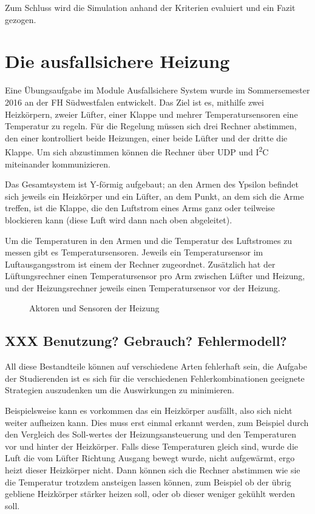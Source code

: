 Zum Schluss wird die Simulation anhand der Kriterien evaluiert und ein Fazit gezogen.

\clearpage
\section{Die ausfallsichere Heizung}\label{heizung}
Eine {\"{U}}bungsaufgabe im Module Ausfallsichere System wurde im Sommersemester 2016 an der FH S{\"{u}}dwestfalen entwickelt. Das Ziel ist es, mithilfe zwei Heizk{\"{o}}rpern, zweier
L{\"{u}}fter, einer Klappe und mehrer Temperatursensoren eine Temperatur zu regeln. F{\"{u}}r die Regelung m{\"{u}}ssen sich drei Rechner abstimmen, den einer kontrolliert
beide Heizungen, einer beide L{\"{u}}fter und der dritte die Klappe. Um sich abzustimmen k{\"{o}}nnen die Rechner {\"{u}}ber UDP und I\textsuperscript{2}C miteinander kommunizieren.

Das Gesamtsystem ist Y-f{\"{o}}rmig aufgebaut; an den Armen des Ypsilon befindet sich jeweils ein Heizk{\"{o}}rper und ein L{\"{u}}fter, an dem Punkt, an dem sich
die Arme treffen, ist die Klappe, die den Luftstrom eines Arms ganz oder teilweise blockieren kann (diese Luft wird dann nach oben abgeleitet).

Um die Temperaturen in den Armen und die Temperatur des Luftstromes zu messen gibt es Temperatursensoren. Jeweils ein Temperatursensor im Luftausgangsstrom ist einem
der Rechner zugeordnet. Zus{\"{a}}tzlich hat der L{\"{u}}ftungsrechner einen Temperatursensor pro Arm zwischen L{\"{u}}fter und Heizung, und der Heizungsrechner jeweils
einen Temperatursensor vor der Heizung.

\begin{figure}
	\centering
	\caption{Aktoren und Sensoren der Heizung}
	\label{fig:heizunghw}
\end{figure}

\subsection{XXX Benutzung? Gebrauch? Fehlermodell?}
All diese Bestandteile k{\"{o}}nnen auf verschiedene Arten fehlerhaft sein, die Aufgabe der Studierenden ist es sich f{\"{u}}r die verschiedenen Fehlerkombinationen
geeignete Strategien auszudenken um die Auswirkungen zu minimieren.

Beispielsweise kann es vorkommen das ein Heizk{\"{o}}rper ausf{\"{a}}llt, also sich nicht weiter aufheizen kann. Dies muss erst einmal erkannt werden, zum Beispiel
durch den Vergleich des Soll-wertes der Heizungsansteuerung und den Temperaturen vor und hinter der Heizk{\"{o}}rper. Falls diese Temperaturen gleich sind,
wurde die Luft die vom L{\"{u}}fter Richtung Ausgang bewegt wurde, nicht aufgew{\"{a}}rmt, ergo heizt dieser Heizk{\"{o}}rper nicht. Dann k{\"{o}}nnen sich die
Rechner abstimmen wie sie die Temperatur trotzdem ansteigen lassen k{\"{o}}nnen, zum Beispiel ob der {\"{u}}brig gebliene Heizk{\"{o}}rper st{\"{a}}rker heizen
soll, oder ob dieser weniger gek{\"{u}}hlt werden soll.

